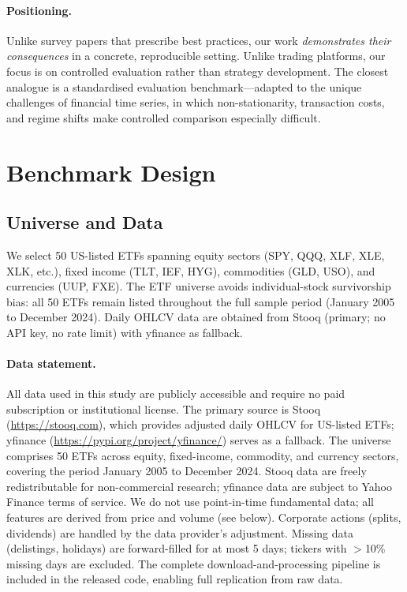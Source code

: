 \documentclass[11pt]{article}
\begin{document}
\paragraph{Positioning.}
Unlike survey papers that prescribe best practices, our work \emph{demonstrates their consequences} in a concrete, reproducible setting.
Unlike trading platforms, our focus is on controlled evaluation rather than strategy development.
The closest analogue is a standardised evaluation benchmark---adapted to the unique challenges of financial time series, in which non-stationarity, transaction costs, and regime shifts make controlled comparison especially difficult.


\section{Benchmark Design}
\label{sec:design}

\subsection{Universe and Data}

We select 50 US-listed ETFs spanning equity sectors (SPY, QQQ, XLF, XLE, XLK, etc.), fixed income (TLT, IEF, HYG), commodities (GLD, USO), and currencies (UUP, FXE).
The ETF universe avoids individual-stock survivorship bias: all 50 ETFs remain listed throughout the full sample period (January 2005 to December 2024).
Daily OHLCV data are obtained from Stooq (primary; no API key, no rate limit) with yfinance as fallback.

\paragraph{Data statement.}
All data used in this study are publicly accessible and require no paid subscription or institutional license.
The primary source is Stooq (\url{https://stooq.com}), which provides adjusted daily OHLCV for US-listed ETFs; yfinance (\url{https://pypi.org/project/yfinance/}) serves as a fallback.
The universe comprises 50 ETFs across equity, fixed-income, commodity, and currency sectors, covering the period January 2005 to December 2024.
Stooq data are freely redistributable for non-commercial research; yfinance data are subject to Yahoo Finance terms of service.
We do not use point-in-time fundamental data; all features are derived from price and volume (see below).
Corporate actions (splits, dividends) are handled by the data provider's adjustment.
Missing data (delistings, holidays) are forward-filled for at most 5 days; tickers with $>$10\% missing days are excluded.
The complete download-and-processing pipeline is included in the released code, enabling full replication from raw data.
\end{document}
